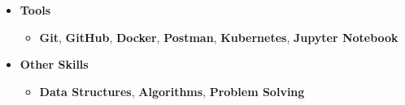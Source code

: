 \documentclass[10pt,a4paper,ragged2e]{altacv}
\begin{document}
\begin{itemize}
\item \large{\textbf{Tools}}
  \begin{itemize}
  \smallskip
    \item \textbf{Git}, \textbf{GitHub}, \textbf{Docker}, \textbf{Postman}, \textbf{Kubernetes}, \textbf{Jupyter Notebook }
  \end{itemize}
  \smallskip

\item \large{\textbf{Other Skills}}
  \begin{itemize}
  \smallskip
    \item \textbf{Data Structures}, \textbf{Algorithms}, \textbf{Problem Solving}
  \end{itemize}
\end{itemize}
\smallskip





\clearpage








\end{document}
